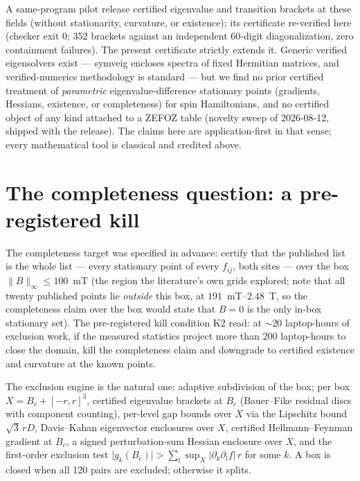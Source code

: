 \documentclass[11pt]{amsart}
\theoremstyle{plain}
\theoremstyle{definition}
\theoremstyle{remark}
\begin{document}
A same-program pilot release certified eigenvalue and transition brackets at
these fields (without stationarity, curvature, or existence); its certificate
re-verified here (checker exit 0; 352 brackets against an independent 60-digit
diagonalization, zero containment failures).  The present certificate strictly
extends it.  Generic verified eigensolvers exist --- symveig \cite{symveig}
encloses spectra of fixed Hermitian matrices, and verified-numerics methodology
is standard \cite{Rump} --- but we find no prior certified treatment of
\emph{parametric} eigenvalue-difference stationary points (gradients, Hessians,
existence, or completeness) for spin Hamiltonians, and no certified object of
any kind attached to a ZEFOZ table (novelty sweep of 2026-08-12, shipped with
the release).  The claims here are application-first in that sense; every
mathematical tool is classical and credited above.

\section{The completeness question: a pre-registered kill}\label{sec:kill}

The completeness target was specified in advance: certify that the published
list is the whole list --- every stationary point of every $f_{ij}$, both
sites --- over the box $\|B\|_\infty\le100$~mT (the region the literature's own
grids explored; note that all twenty published points lie \emph{outside} this
box, at $191$~mT--$2.48$~T, so the completeness claim over the box would state
that $B=0$ is the only in-box stationary set).  The pre-registered kill
condition K2 read: at $\sim$20 laptop-hours of exclusion work, if the measured
statistics project more than $200$ laptop-hours to close the domain, kill the
completeness claim and downgrade to certified existence and curvature at the
known points.

The exclusion engine is the natural one: adaptive subdivision of the box; per
box $X=B_c+[-r,r]^3$, certified eigenvalue brackets at $B_c$ (Bauer--Fike
residual discs with component counting), per-level gap bounds over $X$ via the
Lipschitz bound $\sqrt3\,rD$, Davis--Kahan eigenvector enclosures over $X$,
certified Hellmann--Feynman gradient at $B_c$, a signed perturbation-sum
Hessian enclosure over $X$, and the first-order exclusion test $\lvert
g_k(B_c)\rvert>\sum_l \sup_X\lvert\partial_k\partial_l f\rvert\,r$ for some
$k$.  A box is closed when all 120 pairs are excluded; otherwise it splits.
\end{document}
